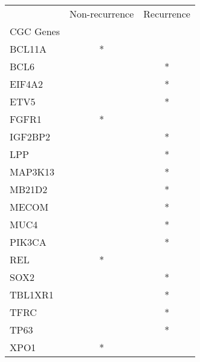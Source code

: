 \begin{tabular}{lcc}
\toprule
{} & Non-recurrence & Recurrence \\
CGC Genes &                &            \\
\midrule
BCL11A    &              * &            \\
BCL6      &                &          * \\
EIF4A2    &                &          * \\
ETV5      &                &          * \\
FGFR1     &              * &            \\
IGF2BP2   &                &          * \\
LPP       &                &          * \\
MAP3K13   &                &          * \\
MB21D2    &                &          * \\
MECOM     &                &          * \\
MUC4      &                &          * \\
PIK3CA    &                &          * \\
REL       &              * &            \\
SOX2      &                &          * \\
TBL1XR1   &                &          * \\
TFRC      &                &          * \\
TP63      &                &          * \\
XPO1      &              * &            \\
\bottomrule
\end{tabular}
